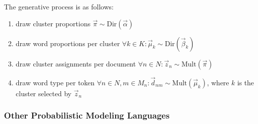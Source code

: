 \begin{Example}
The generative process is as follows:
\begin{enumerate}
\item draw cluster proportions $\vec \pi \sim \text{Dir}(\vec \alpha)$
\item draw word proportions per cluster $\forall k \in K: \vec \mu_k \sim \text{Dir}(\vec \beta_k)$
\item draw cluster assignments per document $\forall n \in N: \vec z_n \sim \text{Mult}(\vec \pi)$
\item draw word type per token $\forall n \in N, m \in M_n: \vec d_{nm} \sim \text{Mult}(\vec \mu_k)$, where $k$ is the cluster selected by $\vec z_n$
\end{enumerate}

\end{Example}

\subsubsection{Other Probabilistic Modeling Languages}

